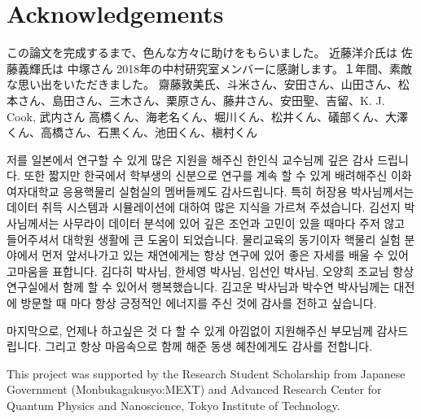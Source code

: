\documentclass[11pt]{book}
\begin{document}










\backmatter



\chapter*{Acknowledgements}

この論文を完成するまで、色んな方々に助けをもらいました。
近藤洋介氏は
佐藤義輝氏は 
中塚さん
2018年の中村研究室メンバーに感謝します。１年間、素敵な思い出をいただきました。
齋藤敦美氏、斗米さん、安田さん、山田さん、松本さん、島田さん、三木さん、栗原さん、藤井さん、安田聖、吉留、K. J. Cook, 武内さん
高橋くん、海老名くん、堀川くん、松井くん、礒部くん、大澤くん、高橋さん、石黒くん、池田くん、槇村くん

저를 일본에서 연구할 수 있게 많은 지원을 해주신 한인식 교수님께 깊은 감사 드립니다. 또한 짧지만 한국에서 학부생의 신분으로 연구를 계속 할 수 있게 배려해주신 이화여자대학교 응용핵물리 실험실의 멤버들께도 감사드립니다. 특히 허장용 박사님께서는 데이터 취득 시스템과 시뮬레이션에 대하여 많은 지식을 가르쳐 주셨습니다. 김선지 박사님께서는 사무라이 데이터 분석에 있어 깊은 조언과 고민이 있을 때마다 주저 않고 들어주셔서 대학원 생활에 큰 도움이 되었습니다. 물리교육의 동기이자 핵물리 실험 분야에서 먼저 앞서나가고 있는 채연에게는 항상 연구에 있어 좋은 자세를 배울 수 있어 고마움을 표합니다. 김다히 박사님, 한세영 박사님, 임선인 박사님, 오양희 조교님 항상 연구실에서 함께 할 수 있어서 행복했습니다. 김고운 박사님과 박수연 박사님께는 대전에 방문할 때 마다 항상 긍정적인 에너지를 주신 것에 감사를 전하고 싶습니다.

마지막으로, 언제나 하고싶은 것 다 할 수 있게 아낌없이 지원해주신 부모님께 감사드립니다. 그리고 항상 마음속으로 함께 해준 동생 혜찬에게도 감사를 전합니다.

This project was supported by the Research Student Scholarship from Japanese Government (Monbukagakusyo:MEXT) and Advanced Research Center for Quantum Physics and Nanoscience, Tokyo Institute of Technology.
\end{document}
